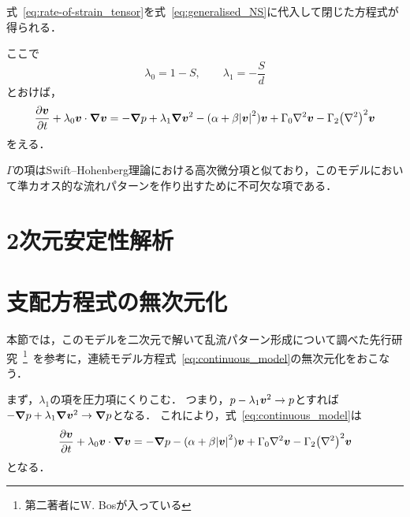 \documentclass[12pt,dvipdfmx,svgnames,a4paper,uplatex]{ujarticle}
\theoremstyle{plain}
\begin{document}
式~\ref{eq:rate-of-strain_tensor}を式~\ref{eq:generalised_NS}に代入して閉じた方程式が得られる．
ここで
\begin{equation}
  \lambda_0 = 1 - S, \qquad \lambda_1 = -\frac{S}{d}
  \label{eq:def_lambda0_lambda1}
\end{equation}
とおけば，
\begin{equation}
  \pdv{\vb*{v}}{t} + \lambda_0 \vb*{v} \cdot \grad{\vb*{v}} = -\grad{p} + \lambda_1 \grad{\vb*{v}^2} - (\alpha + \beta \abs{\vb*{v}}^2) \vb*{v} + \Gamma_0 \laplacian \vb*{v} - \Gamma_2 \qty(\laplacian)^2 \vb*{v}
  \label{eq:continuous_model}
\end{equation}
をえる．

\(\Gamma\)の項はSwift--Hohenberg理論における高次微分項と似ており，このモデルにおいて準カオス的な流れパターンを作り出すために不可欠な項である．


\section{2次元安定性解析}
\label{sec:2D_stability_analysis}


\section{支配方程式の無次元化}
\label{sec:governing_equation_nondimensionalisation}

本節では，このモデルを二次元で解いて乱流パターン形成について調べた先行研究~\footnote{第二著者にW. Bosが入っている}~\cite[脚注28]{James2017}を参考に，連続モデル方程式~\ref{eq:continuous_model}の無次元化をおこなう．

まず，\(\lambda_1\)の項を圧力項にくりこむ．
つまり，\(p - \lambda_1 \vb*{v}^2 \to p\)とすれば\(-\grad{p} + \lambda_1 \grad{\vb*{v}^2} \to \grad{p}\)となる．
これにより，式~\ref{eq:continuous_model}は
\begin{equation}
  \pdv{\vb*{v}}{t} + \lambda_0 \vb*{v} \cdot \grad{\vb*{v}} = -\grad{p} - (\alpha + \beta \abs{\vb*{v}}^2) \vb*{v} + \Gamma_0 \laplacian \vb*{v} - \Gamma_2 \qty(\laplacian)^2 \vb*{v}
  \label{eq:continuous_model_absorb_lambda1}
\end{equation}
となる．
\end{document}
